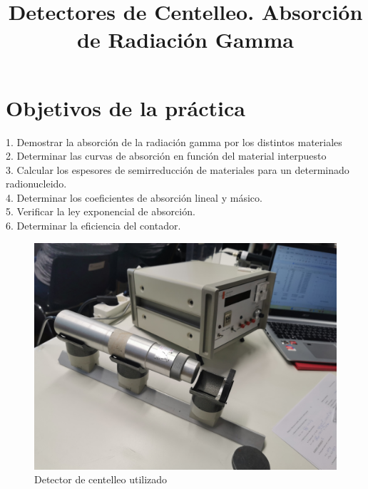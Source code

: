 \documentclass[a4paper,12pt,spanish]{article}
\begin{document}
	
	
	\title{ Detectores de Centelleo. Absorción de Radiación Gamma}
	
	\date{}
	
	\maketitle
	
	
	\section{Objetivos de la práctica}
	
	\vspace{\baselineskip}
	
	1. Demostrar la absorción de la radiación gamma por los distintos materiales\\
	
	2. Determinar las curvas de absorción en función del material interpuesto\\
	
	3. Calcular los espesores de semirreducción de materiales para un determinado radionucleido.\\
	
	4. Determinar los coeficientes de absorción lineal y másico.\\
	
	5. Verificar la ley exponencial de absorción.\\
	
	6. Determinar la eficiencia del contador.
	
	
	
	
	
	
	
	
	
%	
%	
	
%	
	
%	
	
	
	
\begin{figure}[H]
	\centering
	\includegraphics[width=0.7\linewidth]{images/IMG_20240305_121153}
	\caption{Detector de centelleo utilizado}
	\label{fig:img20240305121153}
\end{figure}
	
\end{document}
